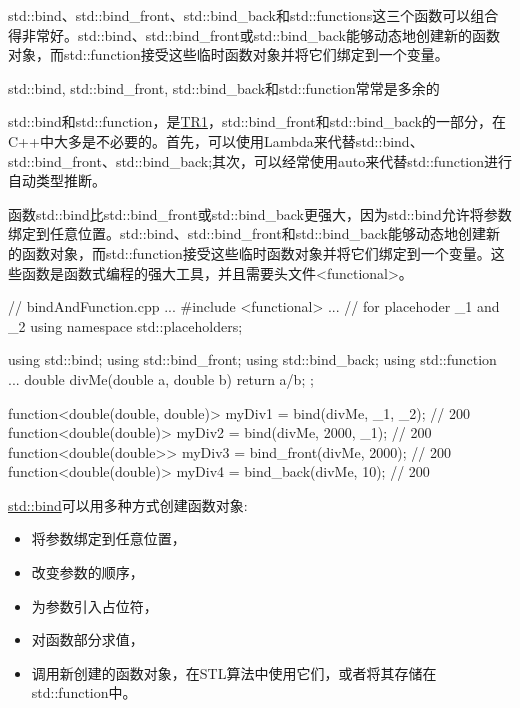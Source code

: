
std::bind、std::bind\_front、std::bind\_back和std::functions这三个函数可以组合得非常好。std::bind、std::bind\_front或std::bind\_back能够动态地创建新的函数对象，而std::function接受这些临时函数对象并将它们绑定到一个变量。

\begin{myTip}{std::bind, std::bind\_front, std::bind\_back和std::function常常是多余的}
	
std::bind和std::function，是\href{https://en.wikipedia.org/wiki/C%2B%2B_Technical_Report_1}{TR1}，std::bind\_front和std::bind\_back的一部分，在C++中大多是不必要的。首先，可以使用Lambda来代替std::bind、std::bind\_front、std::bind\_back;其次，可以经常使用auto来代替std::function进行自动类型推断。
	
\end{myTip}


函数std::bind比std::bind\_front或std::bind\_back更强大，因为std::bind允许将参数绑定到任意位置。std::bind、std::bind\_front和std::bind\_back能够动态地创建新的函数对象，而std::function接受这些临时函数对象并将它们绑定到一个变量。这些函数是函数式编程的强大工具，并且需要头文件<functional>。


\begin{cpp}
// bindAndFunction.cpp
...
#include <functional>
...
// for placehoder _1 and _2
using namespace std::placeholders;

using std::bind;
using std::bind_front;
using std::bind_back;
using std::function
...
double divMe(double a, double b){ return a/b; };

function<double(double, double)> myDiv1 = bind(divMe, _1, _2); // 200
function<double(double)> myDiv2 = bind(divMe, 2000, _1); // 200
function<double(double>> myDiv3 = bind_front(divMe, 2000); // 200
function<double(double)> myDiv4 = bind_back(divMe, 10); // 200
\end{cpp}

\href{http://en.cppreference.com/w/cpp/utility/functional/bind}{std::bind}可以用多种方式创建函数对象:

\begin{itemize}
\item 
将参数绑定到任意位置，

\item 
改变参数的顺序，

\item 
为参数引入占位符，

\item 
对函数部分求值，

\item 
调用新创建的函数对象，在STL算法中使用它们，或者将其存储在std::function中。
\end{itemize}

